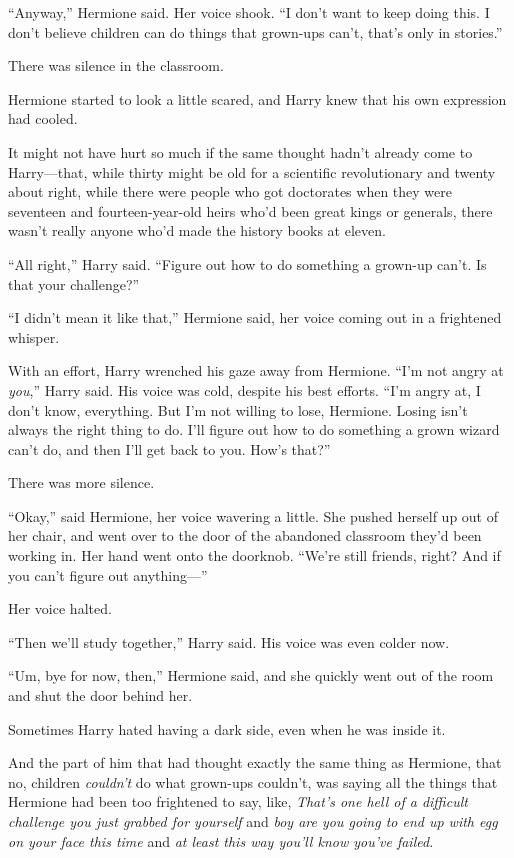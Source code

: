 “Anyway,” Hermione said. Her voice shook. “I don’t want to keep doing this. I don’t believe children can do things that grown-ups can’t, that’s only in stories.”

There was silence in the classroom.

Hermione started to look a little scared, and Harry knew that his own expression had cooled.

It might not have hurt so much if the same thought hadn’t already come to Harry—that, while thirty might be old for a scientific revolutionary and twenty about right, while there were people who got doctorates when they were seventeen and fourteen-year-old heirs who’d been great kings or generals, there wasn’t really anyone who’d made the history books at eleven.

“All right,” Harry said. “Figure out how to do something a grown-up can’t. Is that your challenge?”

“I didn’t mean it like that,” Hermione said, her voice coming out in a frightened whisper.

With an effort, Harry wrenched his gaze away from Hermione. “I’m not angry at \emph{you},” Harry said. His voice was cold, despite his best efforts. “I’m angry at, I don’t know, everything. But I’m not willing to lose, Hermione. Losing isn’t always the right thing to do. I’ll figure out how to do something a grown wizard can’t do, and then I’ll get back to you. How’s that?”

There was more silence.

“Okay,” said Hermione, her voice wavering a little. She pushed herself up out of her chair, and went over to the door of the abandoned classroom they’d been working in. Her hand went onto the doorknob. “We’re still friends, right? And if you can’t figure out anything—”

Her voice halted.

“Then we’ll study together,” Harry said. His voice was even colder now.

“Um, bye for now, then,” Hermione said, and she quickly went out of the room and shut the door behind her.

Sometimes Harry hated having a dark side, even when he was inside it.

And the part of him that had thought exactly the same thing as Hermione, that no, children \emph{couldn’t} do what grown-ups couldn’t, was saying all the things that Hermione had been too frightened to say, like, \emph{That’s one hell of a difficult challenge you just grabbed for yourself} and \emph{boy are you going to end up with egg on your face this time} and \emph{at least this way you’ll know you’ve failed.}

